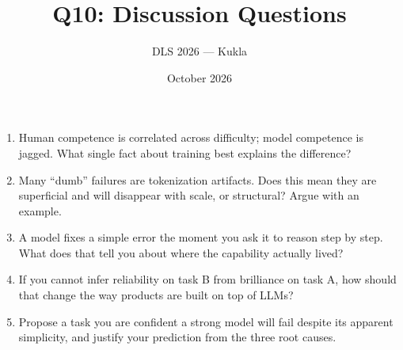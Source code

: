 \documentclass[11pt]{article}
\title{Q10: Discussion Questions}
\author{DLS 2026 --- Kukla}
\date{October 2026}
\begin{document}
\maketitle
\begin{enumerate}[leftmargin=1.5em]
\item Human competence is correlated across difficulty; model competence is jagged. What single fact about training best explains the difference?
\item Many ``dumb'' failures are tokenization artifacts. Does this mean they are superficial and will disappear with scale, or structural? Argue with an example.
\item A model fixes a simple error the moment you ask it to reason step by step. What does that tell you about where the capability actually lived?
\item If you cannot infer reliability on task B from brilliance on task A, how should that change the way products are built on top of LLMs?
\item Propose a task you are confident a strong model will fail despite its apparent simplicity, and justify your prediction from the three root causes.
\end{enumerate}
\end{document}
